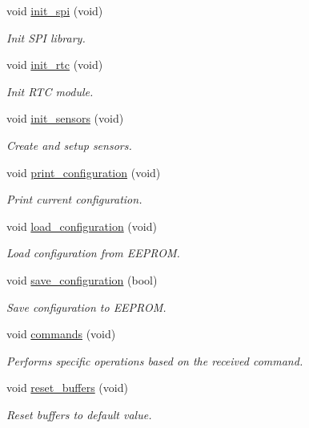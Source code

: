 \begin{DoxyCompactItemize}
void \hyperlink{i2c-rain_8h_a4454f968b2402a0e61deb15ab2571dab}{init\+\_\+spi} (void)
\begin{DoxyCompactList}\small\item\em Init S\+PI library. \end{DoxyCompactList}\item 
void \hyperlink{i2c-rain_8h_a88533ad02465ce52d4e6de7b2095ec32}{init\+\_\+rtc} (void)
\begin{DoxyCompactList}\small\item\em Init R\+TC module. \end{DoxyCompactList}\item 
void \hyperlink{i2c-rain_8h_ad7577ba7f06f417a019b69da8682ede5}{init\+\_\+sensors} (void)
\begin{DoxyCompactList}\small\item\em Create and setup sensors. \end{DoxyCompactList}\item 
void \hyperlink{i2c-rain_8h_ab08b9047f47849f399950705e769be2e}{print\+\_\+configuration} (void)
\begin{DoxyCompactList}\small\item\em Print current configuration. \end{DoxyCompactList}\item 
void \hyperlink{i2c-rain_8h_a1be652e7d942160a14a560e0be837358}{load\+\_\+configuration} (void)
\begin{DoxyCompactList}\small\item\em Load configuration from E\+E\+P\+R\+OM. \end{DoxyCompactList}\item 
void \hyperlink{i2c-rain_8h_a8801fa7c9f323c5b8b9b2bb5b1c438ff}{save\+\_\+configuration} (bool)
\begin{DoxyCompactList}\small\item\em Save configuration to E\+E\+P\+R\+OM. \end{DoxyCompactList}\item 
void \hyperlink{i2c-rain_8h_aaad2f6556489c51f2c24302e2cb4188a}{commands} (void)
\begin{DoxyCompactList}\small\item\em Performs specific operations based on the received command. \end{DoxyCompactList}\item 
void \hyperlink{i2c-rain_8h_a717429168fb5542a7b36a94712f7c67e}{reset\+\_\+buffers} (void)
\begin{DoxyCompactList}\small\item\em Reset buffers to default value. \end{DoxyCompactList}\item 

\end{DoxyCompactItemize}
